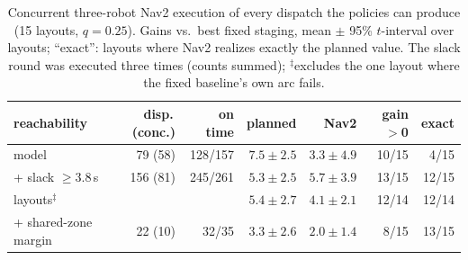 \documentclass[letterpaper,journal]{IEEEtran}
\theoremstyle{remark}
\begin{document}
\begin{table}[!t]
\centering
\caption{Concurrent three-robot Nav2 execution of every dispatch the policies can produce (15 layouts, $q=0.25$). Gains vs.\ best fixed staging, mean $\pm$ 95\% $t$-interval over layouts; ``exact'': layouts where Nav2 realizes exactly the planned value. The slack round was executed three times (counts summed); $^\ddagger$excludes the one layout where the fixed baseline's own arc fails.}
\label{tab:gzc}
\scriptsize\setlength{\tabcolsep}{1.9pt}
\begin{tabular}{@{}lrrrrrr@{}}
\toprule
reachability & disp.\,(conc.) & on time & planned & Nav2 & gain$>$0 & exact\\
\midrule
model & 79 (58) & 128/157 & $7.5\pm2.5$ & $3.3\pm4.9$ & 10/15 & 4/15\\
+ slack $\ge3.8$\,s & 156 (81) & 245/261 & $5.3\pm2.5$ & $5.7\pm3.9$ & 13/15 & 12/15\\
\quad 14 layouts$^\ddagger$ & & & $5.4\pm2.7$ & $\mathbf{4.1\pm2.1}$ & 12/14 & 12/14\\
+ shared-zone margin & 22 (10) & 32/35 & $3.3\pm2.6$ & $2.0\pm1.4$ & 8/15 & 13/15\\
\bottomrule
\end{tabular}
\end{table}
\end{document}
